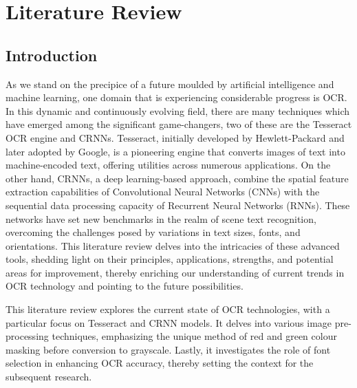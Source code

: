 \chapter{Literature Review}
\label{chap:litreview}


\section{Introduction}



As we stand on the precipice of a future moulded by artificial intelligence and machine learning, one domain that is experiencing considerable progress is OCR. In this dynamic and continuously evolving field, there are many techniques which have emerged among the significant game-changers, two of these are the Tesseract OCR engine and CRNNs. Tesseract, initially developed by Hewlett-Packard and later adopted by Google, is a pioneering engine that converts images of text into machine-encoded text, offering utilities across numerous applications. On the other hand, CRNNs, a deep learning-based approach, combine the spatial feature extraction capabilities of Convolutional Neural Networks (CNNs) with the sequential data processing capacity of Recurrent Neural Networks (RNNs). These networks have set new benchmarks in the realm of scene text recognition, overcoming the challenges posed by variations in text sizes, fonts, and orientations. This literature review delves into the intricacies of these advanced tools, shedding light on their principles, applications, strengths, and potential areas for improvement, thereby enriching our understanding of current trends in OCR technology and pointing to the future possibilities.

This literature review explores the current state of OCR technologies, with a particular focus on Tesseract and CRNN models. It delves into various image pre-processing techniques, emphasizing the unique method of red and green colour masking before conversion to grayscale. Lastly, it investigates the role of font selection in enhancing OCR accuracy, thereby setting the context for the subsequent research.

